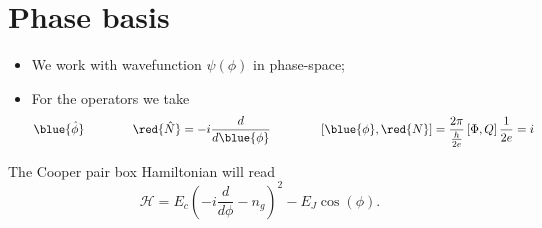 \section{Phase basis}
 
 \begin{itemize}
 	\item We work with wavefunction $ \psi(\phi) $ in phase-space;
 	\item For the operators we take
 	\begin{equation}\label{key}
 		\blue{\hat{\phi}} \qquad \qquad \red{\hat{N}} = -i\frac{d}{d\blue{\phi}}\qquad\qquad \left[\blue{\phi},\red{N}\right] = \frac{2\pi}{\frac{h}{2e}}\left[\Phi,Q\right]\frac{1}{2e} = i\\
 	\end{equation}
 \end{itemize}

 The Cooper pair box Hamiltonian will read
 \begin{equation}\label{key}
 	\mathcal{H} = E_c\left(-i\frac{d}{d\phi} - n_g\right)^2 - E_J\cos(\phi).
 \end{equation}
\newpage 
